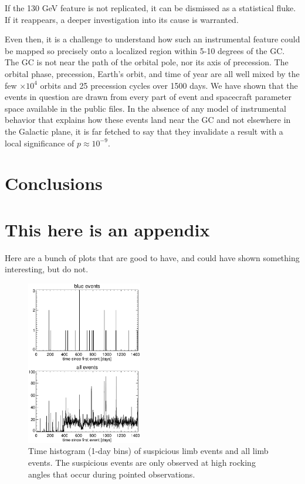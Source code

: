 \documentclass[aps,twocolumn,prd,superscriptaddress,showpacs,nofootinbib,fixfloat]{revtex4}
\begin{document}
If the 130 GeV feature is not replicated, it can be dismissed as a statistical
fluke.  If it reappears, a deeper investigation into its cause is warranted.  

Even then, it is a challenge to understand how such an instrumental feature
could be mapped so precisely onto a localized region within 5-10 degrees of
the GC.  The GC is not near the path of the orbital pole, nor its axis of
precession.  The orbital phase, precession, Earth's orbit, and time of year
are all well mixed by the few $\times10^4$ orbits and 25 precession cycles
over 1500 days.  We have shown that the events in question are drawn from
every part of event and spacecraft parameter space available in the public
files.  In the absence of any model of instrumental behavior that explains how
these events land near the GC and not elsewhere in the Galactic plane, it is
far fetched to say that they invalidate a result with a local significance of
$p\approx10^{-9}$.  


\section{Conclusions}

\clearpage
\appendix
\section{This here is an appendix}

Here are a bunch of plots that are good to have, and could have shown
something interesting, but do not. 

\begin{figure}[p]
\centering
\includegraphics[width=0.45\textwidth]{plots/timehist.ps}
\caption{Time histogram (1-day bins) of suspicious limb events and all limb
events.  The suspicious events are only observed at high rocking
angles that occur during pointed observations.
}
\label{fig:timehist}
\end{figure}
\end{document}
